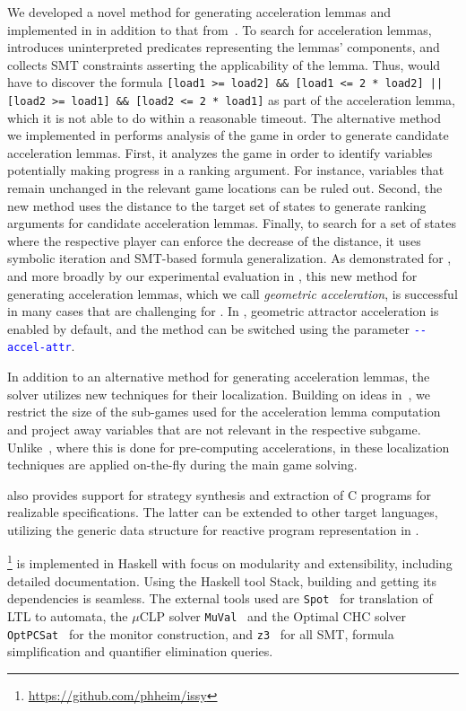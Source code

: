 We developed a novel method for generating acceleration lemmas and  implemented in \issy in addition to that from~\cite{HeimD24}.
To search for acceleration lemmas,  \rpgsolve introduces uninterpreted predicates representing the lemmas' components, and collects SMT constraints asserting the applicability of the lemma.  Thus,  \rpgsolve would have to discover the formula \texttt{[load1 >= load2] \&\& [load1 <= 2 * load2]  ||[load2 >= load1] \&\& [load2 <= 2 * load1]} as part of the acceleration lemma, which it is not able to do within a reasonable timeout.
The alternative method we implemented in \issy performs analysis of the game in order to generate candidate  acceleration lemmas.
First,  it analyzes the game in order to identify variables potentially making progress in a ranking argument.  For instance,  variables that remain unchanged in the relevant game locations can  be ruled out.  
Second, the new method uses the distance to the target set of states to generate ranking arguments for candidate acceleration lemmas.  Finally,  to search for a set of states where the  respective player can enforce the decrease of the distance, it uses symbolic iteration and SMT-based formula generalization.  As demonstrated for , and more broadly by our experimental evaluation in ,  this new method for generating acceleration lemmas, which we call \emph{geometric acceleration}, is successful in many cases that are challenging for \rpgsolve. In \issy, geometric attractor acceleration is enabled by default, and the method can be switched using the parameter \texttt{\textcolor{blue}{-{}-accel-attr}}.

In addition to an alternative method for generating acceleration lemmas,  the \issy solver utilizes new techniques for their localization. Building on ideas in~\cite{SchmuckHDN24}, 
we restrict the size of the sub-games used for the acceleration lemma computation and project away variables that are not relevant in the respective subgame.  Unlike~\cite{SchmuckHDN24}, where this is done for pre-computing accelerations,  in \issy these localization techniques are applied on-the-fly during the main game solving.

\issy also provides support for strategy synthesis and extraction of C programs for realizable specifications.  The latter can be extended to other target languages,  utilizing the 
generic data structure for reactive program representation in \issy.

\issy\footnote{\url{https://github.com/phheim/issy}} is implemented in Haskell with focus on modularity and extensibility,  including detailed documentation.  Using the Haskell tool Stack,  building  \issy and getting its dependencies is seamless.
The external tools used are \texttt{Spot}~\cite{Duret-LutzRCRAS22}  for translation of LTL  to automata,  the $\mu$CLP solver \texttt{MuVal}~\cite{UnnoTGK23} and the Optimal CHC solver \texttt{OptPCSat}~\cite{GuTU23}  for the monitor construction,  and \texttt{z3}~\cite{Z3} for all SMT,  formula simplification and quantifier elimination queries.


